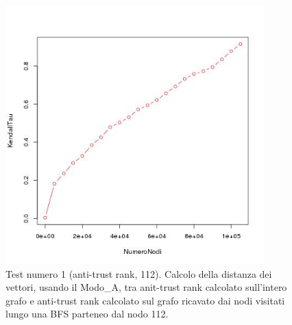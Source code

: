  \begin{figure}
\centering
 \includegraphics[width=10cm]{immagini/test1/antiTrustrankTestMode0_112}
 \caption{Test numero 1 (anti-trust rank, 112). Calcolo della distanza dei vettori, usando il Modo\_A, tra anit-trust rank calcolato sull'intero grafo e anti-trust rank calcolato sul grafo ricavato dai nodi visitati lungo una BFS parteneo dal nodo 112.}
 \label{fig:test1antitrustModoA112}
\end{figure}











